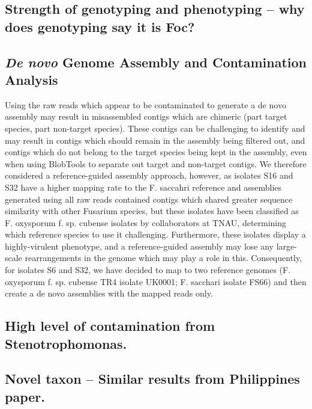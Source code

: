 \subsection{Strength of genotyping and phenotyping – why does genotyping say it is Foc?}
\subsection{\textit{De novo} Genome Assembly and Contamination Analysis}
Using the raw reads which appear to be contaminated to generate a de novo assembly may result in misassembled contigs which are chimeric (part target species, part non-target species). These contigs can be challenging to identify and may result in contigs which should remain in the assembly being filtered out, and contigs which do not belong to the target species being kept in the assembly, even when using BlobTools to separate out target and non-target contigs. We therefore considered a reference-guided assembly approach, however, as isolates S16 and S32 have a higher mapping rate to the F. saccahri reference and assemblies generated using all raw reads contained contigs which shared greater sequence similarity with other Fusarium species, but these isolates have been classified as F. oxysporum f. sp. cubense isolates by collaborators at TNAU, determining which reference species to use it challenging. Furthermore, these isolates display a highly-virulent phenotype, and a reference-guided assembly may lose any large-scale rearrangements in the genome which may play a role in this. Consequently, for isolates S6 and S32, we have decided to map to two reference genomes (F. oxysporum f. sp. cubense TR4 isolate UK0001; F. sacchari isolate FS66) and then create a de novo assemblies with the mapped reads only. 
\subsection{High level of contamination from Stenotrophomonas.}
\subsection{Novel taxon – Similar results from Philippines paper.}

